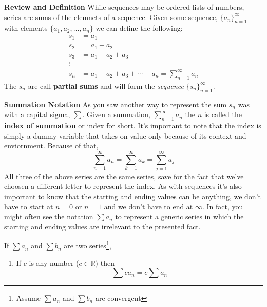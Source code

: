 \documentclass[addpoints]{exam}
\begin{document}
    \begin{tcolorbox}[breakable, title=SERIES, colframe=black, sharp corners, colback=white, colbacktitle=white, coltitle=black]
      \Large \textbf{Review and Definition}
      \newline\normalsize While sequences may be ordered lists of numbers, series are sums of the elemnets of a sequence. Given some sequence, $\{a_n\}_{n=1}^\infty$ with elements $\{a_1, a_2, \ldots, a_n\}$ we can define the following: 
      \begin{align*}
        s_1 &= a_1 \\
        s_2 &= a_1 + a_2 \\ 
        s_3 &= a_1 + a_2 + a_3 \\ 
        \vdots \\ 
        s_n &= a_1 + a_2 + a_3 + \cdots + a_n = \sum\limits_{n=1}^\infty a_n
      \end{align*}
      The $s_n$ are call \textbf{partial sums} and will form the \textit{sequence} $\{s_n\}_{n=1}^\infty$.
      \newline
      \vspace{0.1in}
      \noindent\makebox[\linewidth]{\hrulefill}

      \large\textbf{Summation Notation}
      \newline\normalsize As you saw another way to represent the sum $s_n$ was with a capital sigma, $\sum$. Given a summation, $\sum\limits_{n=1}^\infty a_n$ the $n$ is called the \textbf{index of summation} or index for short. It's important to note that the index is simply a dummy variable that takes on value only because of its context and enviornment. Because of that, 
      \[
          \sum\limits_{n=1}^\infty a_n = \sum\limits_{k=1}^\infty a_k = \sum\limits_{j=1}^\infty a_j
      \]
      All three of the above series are the same series, save for the fact that we've choosen a different letter to represent the index. As with sequences it's also important to know that the starting and ending values can be anything, we don't have to start at $n=0$ or $n=1$ and we don't have to end at $\infty$. In fact, you might often see the notation $\sum a_n$ to represent a generic series in which the starting and ending values are irrelevant to the presented fact. 
          \begin{tcolorbox}[breakable, title=PROPERTIES OF SERIES, colframe=black, sharp corners, colback=white, colbacktitle=white, coltitle=black]
            If $\sum a_n$ and $\sum b_n$ are two series\footnote{Assume $\sum a_n$ and $\sum b_n$ are convergent},
            \begin{enumerate}
              \item If $c$ is any number ($c \in \mathbb{R}$) then 
                \[
                  \sum ca_n = c\sum a_n
                \]


\end{enumerate}
\end{tcolorbox}
\end{tcolorbox}
\end{document}
